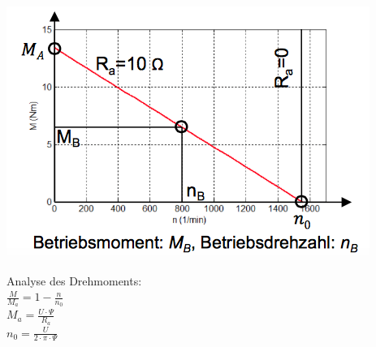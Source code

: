 \begin{minipage}{0.4 \linewidth}
\includegraphics[width = \linewidth]{./Pics/VL45/Nebenschluss2}
\end{minipage}
\begin{minipage}{0.6 \linewidth}
Analyse des Drehmoments: \\

$\frac{M}{M_a} = 1 - \frac{n}{n_0}$\\

$M_a = \frac{U \cdot \Psi}{R_a}$\\

$n_0 = \frac{U}{2 \cdot \pi \cdot \Psi}$
\end{minipage}

